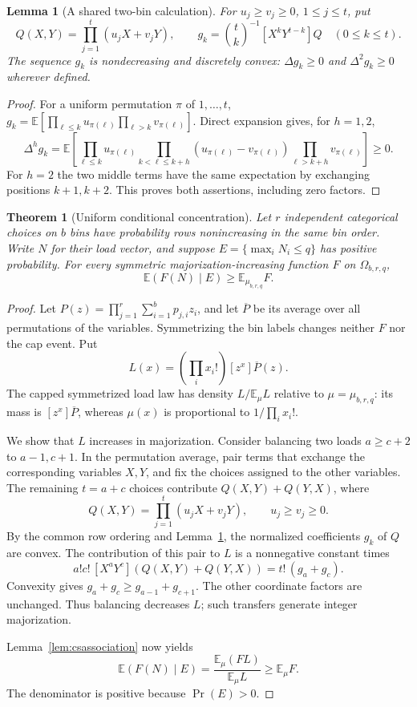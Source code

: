 \documentclass[11pt]{article}
\newtheorem{theorem}{Theorem}
\newtheorem{lemma}{Lemma}
\begin{document}
\begin{lemma}[A shared two-bin calculation]\label{lem:pairmeans}
For $u_j\geq v_j\geq0$, $1\leq j\leq t$, put
\[
 Q(X,Y)=\prod_{j=1}^t(u_jX+v_jY),\qquad
 g_k=\binom tk^{-1}[X^kY^{t-k}]Q\quad(0\leq k\leq t).
\]
The sequence $g_k$ is nondecreasing and discretely convex:
$\Delta g_k\geq0$ and $\Delta^2g_k\geq0$ wherever defined.
\end{lemma}
\begin{proof}
For a uniform permutation $\pi$ of $1,\ldots,t$,
$g_k=\mathbb E[\prod_{\ell\leq k}u_{\pi(\ell)}
\prod_{\ell>k}v_{\pi(\ell)}]$. Direct expansion gives, for $h=1,2$,
\[
 \Delta^h g_k=\mathbb E\left[
 \prod_{\ell\leq k}u_{\pi(\ell)}
 \prod_{k<\ell\leq k+h}(u_{\pi(\ell)}-v_{\pi(\ell)})
 \prod_{\ell>k+h}v_{\pi(\ell)}\right]\geq0.
\]
For $h=2$ the two middle terms have the same expectation by exchanging
positions $k+1,k+2$. This proves both assertions, including zero factors.
\end{proof}

\begin{theorem}[Uniform conditional concentration]\label{thm:allconcentration}
Let $r$ independent categorical choices on $b$ bins have probability
rows nonincreasing in the same bin order. Write $N$ for their load vector,
and suppose $E=\{\max_iN_i\leq q\}$ has positive probability.
For every symmetric majorization-increasing function $F$ on
$\Omega_{b,r,q}$,
\[
 \mathbb E(F(N)\mid E)\geq\mathbb E_{\mu_{b,r,q}}F.
\]
\end{theorem}
\begin{proof}
Let $P(z)=\prod_{j=1}^r\sum_{i=1}^b p_{j,i}z_i$, and let
$\overline P$ be its average over all permutations of the variables.
Symmetrizing the bin labels changes neither $F$ nor the cap event.
Put
\[
 L(x)=\left(\prod_i x_i!\right)[z^x]\overline P(z).
\]
The capped symmetrized load law has density $L/\mathbb E_\mu L$
relative to $\mu=\mu_{b,r,q}$: its mass is $[z^x]\overline P$,
whereas $\mu(x)$ is proportional to $1/\prod_i x_i!$.

We show that $L$ increases in majorization. Consider balancing two
loads $a\geq c+2$ to $a-1,c+1$. In the permutation average, pair
terms that exchange the corresponding variables $X,Y$, and fix the
choices assigned to the other variables. The remaining $t=a+c$
choices contribute $Q(X,Y)+Q(Y,X)$, where
\[
 Q(X,Y)=\prod_{j=1}^t(u_jX+v_jY),\qquad u_j\geq v_j\geq0.
\]
By the common row ordering and Lemma~\ref{lem:pairmeans}, the
normalized coefficients $g_k$ of $Q$ are convex. The contribution
of this pair to $L$ is a nonnegative constant times
\[
 a!c!\,[X^aY^c](Q(X,Y)+Q(Y,X))=t!\,(g_a+g_c).
\]
Convexity gives $g_a+g_c\geq g_{a-1}+g_{c+1}$. The other
coordinate factors are unchanged. Thus balancing decreases $L$;
such transfers generate integer majorization.

Lemma~\ref{lem:csassociation} now yields
\[
 \mathbb E(F(N)\mid E)
   =\frac{\mathbb E_\mu(FL)}{\mathbb E_\mu L}
   \geq\mathbb E_\mu F.
\]
The denominator is positive because $\Pr(E)>0$.
\end{proof}
\end{document}
